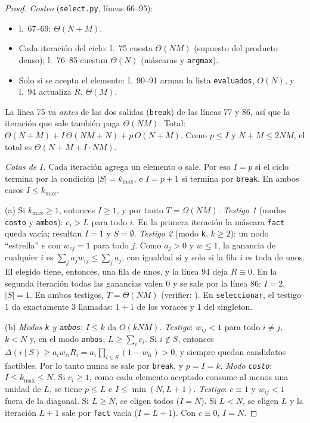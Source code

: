 \begin{proof}
\emph{Costeo} (\texttt{select.py}, líneas 66–95):
\begin{itemize}[nosep]
\item l.~67–69: $\Theta(N+M)$.
\item Cada iteración del ciclo: l.~75 cuesta $\Theta(NM)$ (supuesto del producto denso); l.~76–85 cuestan $\Theta(N)$ (máscaras y \texttt{argmax}).
\item Solo si se acepta el elemento: l.~90–91 arman la lista \texttt{evaluados}, $O(N)$, y l.~94 actualiza $R$, $\Theta(M)$.
\end{itemize}
La línea 75 va \emph{antes} de las dos salidas (\texttt{break}) de las líneas 77 y 86, así que la iteración que sale también paga $\Theta(NM)$. Total: $\Theta(N+M)+I\,\Theta(NM+N)+p\,O(N+M)$. Como $p\le I$ y $N+M\le2NM$, el total es $\Theta(N+M+I\cdot NM)$.

\emph{Cotas de $I$.} Cada iteración agrega un elemento o sale. Por eso $I=p$ si el ciclo termina por la condición $|S|=k_{\max}$, e $I=p+1$ si termina por \texttt{break}. En ambos casos $I\le k_{\max}$.

(a) Si $k_{\max}\ge1$, entonces $I\ge1$, y por tanto $T=\Omega(NM)$. \emph{Testigo 1} (modos \texttt{costo} y \texttt{ambos}): $c_i>L$ para todo $i$. En la primera iteración la máscara \texttt{fact} queda vacía; resultan $I=1$ y $S=\emptyset$. \emph{Testigo 2} (modo \texttt{k}, $k\ge2$): un nodo ``estrella'' $e$ con $w_{ej}=1$ para todo $j$. Como $a_j>0$ y $w\le1$, la ganancia de cualquier $i$ es $\sum_ja_jw_{ij}\le\sum_ja_j$, con igualdad si y solo si la fila $i$ es toda de unos. El elegido tiene, entonces, una fila de unos, y la línea 94 deja $R\equiv0$. En la segunda iteración todas las ganancias valen $0$ y se sale por la línea 86: $I=2$, $|S|=1$. En ambos testigos, $T=\Theta(NM)$ (verifier: ). En \texttt{seleccionar}, el testigo 1 da exactamente $3$ llamadas: $1+1$ de los voraces y $1$ del singleton.

(b) \emph{Modos \texttt{k} y \texttt{ambos}}: $I\le k$ da $O(kNM)$. \emph{Testigo}: $w_{ij}<1$ para todo $i\ne j$, $k<N$ y, en el modo \texttt{ambos}, $L\ge\sum_ic_i$. Si $i\notin S$, entonces $\Delta(i\mid S)\ge a_iw_{ii}R_i=a_i\prod_{l\in S}(1-w_{li})>0$, y siempre quedan candidatos factibles. Por lo tanto nunca se sale por \texttt{break}, y $p=I=k$. \emph{Modo \texttt{costo}}: $I\le k_{\max}\le N$. Si $c_i\ge1$, como cada elemento aceptado consume al menos una unidad de $L$, se tiene $p\le L$ e $I\le\min(N,L+1)$. \emph{Testigo}: $c\equiv1$ y $w_{ij}<1$ fuera de la diagonal. Si $L\ge N$, se eligen todos ($I=N$). Si $L<N$, se eligen $L$ y la iteración $L+1$ sale por \texttt{fact} vacía ($I=L+1$). Con $c\equiv0$, $I=N$.


\end{proof}
